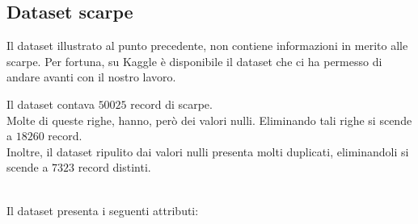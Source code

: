 \documentclass[a4paper, 11pt, oneside]{report}
\begin{document}
                \subsection{Dataset scarpe}
                Il dataset illustrato al punto precedente, non contiene informazioni in merito alle scarpe.
                Per fortuna, su Kaggle \cite{3} è disponibile il dataset \cite{7} che ci ha permesso di andare avanti con il nostro lavoro.
                \\
                \par \noindent Il dataset contava $50025$ record di scarpe.
                \\
                Molte di queste righe, hanno, però dei valori nulli.
                Eliminando tali righe si scende a $18260$ record.\\
                Inoltre, il dataset ripulito dai valori nulli presenta molti duplicati, eliminandoli si scende a $7323$ record distinti.\\
                \\
                \par \noindent Il dataset presenta i seguenti attributi:
\end{document}
